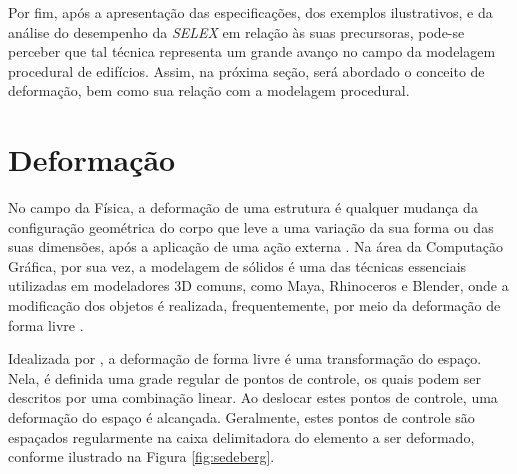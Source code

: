 \vspace{1cm}

Por fim, após a apresentação das especificações, dos exemplos ilustrativos, e da análise do desempenho da \textit{SELEX} em relação às suas precursoras, pode-se perceber que tal técnica representa um grande avanço no campo da modelagem procedural de edifícios. Assim, na próxima seção, será abordado o conceito de deformação, bem como sua relação com a modelagem procedural.

\newpage

\section{Deformação}
\label{sec:deformacao}

No campo da Física, a deformação de uma estrutura é qualquer mudança da configuração geométrica do corpo que leve a uma variação da sua forma ou das suas dimensões, após a aplicação de uma ação externa \cite{truesdell1992}. Na área da Computação Gráfica, por sua vez, a modelagem de sólidos é uma das técnicas essenciais utilizadas em modeladores 3D comuns, como Maya, Rhinoceros e Blender, onde a modificação dos objetos é realizada, frequentemente, por meio da deformação de forma livre \cite{jana2017}.



Idealizada por , a deformação de forma livre é uma transformação do espaço. Nela, é definida uma grade regular de pontos de controle, os quais podem ser descritos por uma combinação linear. Ao deslocar estes pontos de controle, uma deformação do espaço é alcançada. Geralmente, estes pontos de controle são espaçados regularmente na caixa delimitadora do elemento a ser deformado, conforme ilustrado na Figura \ref{fig:sedeberg}.

\begin{figure}[h!]
	\centering
	\captionsetup{width=15cm}
	{}	
\end{figure}

